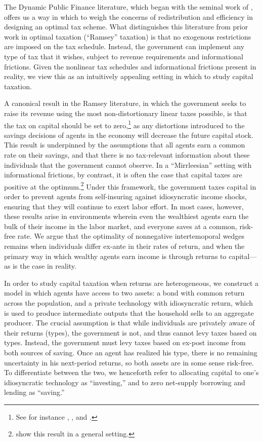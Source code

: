 \documentclass[11pt]{article}
\begin{document}
The Dynamic Public Finance literature, which began with the seminal work of \cite{mirrlees1971exploration}, offers us a way in which to weigh the concerns of redistribution and efficiency in designing an optimal tax scheme. What distinguishes this literature from prior work in optimal taxation (``Ramsey'' taxation) is that no exogenous restrictions are imposed on the tax schedule. Instead, the government can implement any type of tax that it wishes, subject to revenue requirements and informational frictions. Given the nonlinear tax schedules and informational frictions present in reality, we view this as an intuitively appealing setting in which to study capital taxation. 

A canonical result in the Ramsey literature, in which the government seeks to raise its revenue using the most non-distortionary linear taxes possible, is that the tax on capital should be set to zero,\footnote{See for instance \cite{atkinson1976design}, \cite{chamley1986optimal}, and \cite{judd1982redistributive}.} as any distortions introduced to the savings decisions of agents in the economy will decrease the future capital stock. This result is underpinned by the assumptions that all agents earn a common rate on their savings, and that there is no tax-relevant information about these individuals that the government cannot observe. In a ``Mirrleesian'' setting with informational frictions, by contrast, it is often the case that capital taxes are positive at the optimum.\footnote{\cite{golosov2003optimal} show this result in a general setting.} Under this framework, the government taxes capital in order to prevent agents from self-insuring against idiosyncratic income shocks, ensuring that they will continue to exert labor effort. In most cases, however, these results arise in environments wherein even the wealthiest agents earn the bulk of their income in the labor market, and everyone saves at a common, risk-free rate. We argue that the optimality of nonnegative intertemoporal wedges remains when individuals differ ex-ante in their rates of return, and when the primary way in which wealthy agents earn income is through returns to capital---as is the case in reality. 

In order to study capital taxation when returns are heterogeneous, we construct a model in which agents have access to two assets: a bond with common return across the population, and a private technology with idiosyncratic return, which is used to produce intermediate outputs that the household sells to an aggregate producer. The crucial assumption is that while individuals are privately aware of their returns (types), the government is not, and thus cannot levy taxes based on types. Instead, the government must levy taxes based on ex-post income from both sources of saving. Once an agent has realized his type, there is no remaining uncertainty in his next-period returns, so both assets are in some sense risk-free. To differentiate between the two, we henceforth refer to allocating capital to one's idiosyncratic technology as ``investing,'' and to zero net-supply borrowing and lending as ``saving.''
\end{document}
